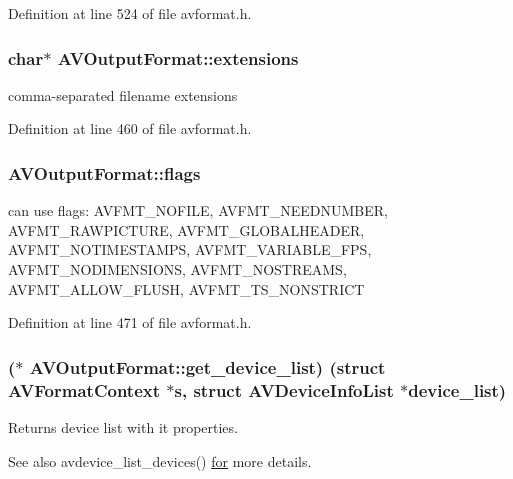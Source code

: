 Definition at line 524 of file avformat.\+h.

\subsubsection[{\texorpdfstring{extensions}{extensions}}]{ char$\ast$ A\+V\+Output\+Format\+::extensions}\hypertarget{struct_a_v_output_format_a10f19abe463890063659723c90c15335}{}\label{struct_a_v_output_format_a10f19abe463890063659723c90c15335}
comma-\/separated filename extensions 

Definition at line 460 of file avformat.\+h.

\subsubsection[{\texorpdfstring{flags}{flags}}]{ A\+V\+Output\+Format\+::flags}\hypertarget{struct_a_v_output_format_aad55a00e728a020c1dcfaaf695320445}{}\label{struct_a_v_output_format_aad55a00e728a020c1dcfaaf695320445}
can use flags\+: A\+V\+F\+M\+T\+\_\+\+N\+O\+F\+I\+LE, A\+V\+F\+M\+T\+\_\+\+N\+E\+E\+D\+N\+U\+M\+B\+ER, A\+V\+F\+M\+T\+\_\+\+R\+A\+W\+P\+I\+C\+T\+U\+RE, A\+V\+F\+M\+T\+\_\+\+G\+L\+O\+B\+A\+L\+H\+E\+A\+D\+ER, A\+V\+F\+M\+T\+\_\+\+N\+O\+T\+I\+M\+E\+S\+T\+A\+M\+PS, A\+V\+F\+M\+T\+\_\+\+V\+A\+R\+I\+A\+B\+L\+E\+\_\+\+F\+PS, A\+V\+F\+M\+T\+\_\+\+N\+O\+D\+I\+M\+E\+N\+S\+I\+O\+NS, A\+V\+F\+M\+T\+\_\+\+N\+O\+S\+T\+R\+E\+A\+MS, A\+V\+F\+M\+T\+\_\+\+A\+L\+L\+O\+W\+\_\+\+F\+L\+U\+SH, A\+V\+F\+M\+T\+\_\+\+T\+S\+\_\+\+N\+O\+N\+S\+T\+R\+I\+CT 

Definition at line 471 of file avformat.\+h.

\subsubsection[{\texorpdfstring{get\+\_\+device\+\_\+list}{get_device_list}}]{($\ast$ A\+V\+Output\+Format\+::get\+\_\+device\+\_\+list) (struct {\bf A\+V\+Format\+Context} $\ast${\bf s}, struct A\+V\+Device\+Info\+List $\ast$device\+\_\+list)}\hypertarget{struct_a_v_output_format_adb9c784dcf21e76db0b18c9d019cb723}{}\label{struct_a_v_output_format_adb9c784dcf21e76db0b18c9d019cb723}
Returns device list with it properties. \begin{DoxySeeAlso}{See also}
avdevice\+\_\+list\+\_\+devices() \hyperlink{hashrout_8h_a63bdfbdfaa50cfc85afcbff4ce2c16a6}{for} more details. 
\end{DoxySeeAlso}


